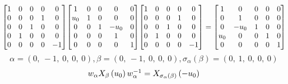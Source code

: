 \documentclass[11pt]{article}
\theoremstyle{definition}
\begin{document}
\[
\scaletoalign{\textwidth}{{\left[\begin{matrix}1 & 0 & 0 & 0 & 0\\0 & 0 & 0 & 1 & 0\\0 & 0 & 1 & 0 & 0\\0 & 1 & 0 & 0 & 0\\0 & 0 & 0 & 0 & -1\end{matrix}\right]} {\left[\begin{matrix}1 & 0 & 0 & 0 & 0\\u_{0} & 1 & 0 & 0 & 0\\0 & 0 & 1 & - u_{0} & 0\\0 & 0 & 0 & 1 & 0\\0 & 0 & 0 & 0 & 1\end{matrix}\right]} {\left[\begin{matrix}1 & 0 & 0 & 0 & 0\\0 & 0 & 0 & 1 & 0\\0 & 0 & 1 & 0 & 0\\0 & 1 & 0 & 0 & 0\\0 & 0 & 0 & 0 & -1\end{matrix}\right]} = {\left[\begin{matrix}1 & 0 & 0 & 0 & 0\\0 & 1 & 0 & 0 & 0\\0 & - u_{0} & 1 & 0 & 0\\u_{0} & 0 & 0 & 1 & 0\\0 & 0 & 0 & 0 & 1\end{matrix}\right]}}
\]
\[
\alpha = \left( 0, \  -1, \  0, \  0, \  0\right), \beta = \left( 0, \  -1, \  0, \  0, \  0\right), \sigma_{\alpha}(\beta) = \left( 0, \  1, \  0, \  0, \  0\right)
\]
\[
\scaletoalign{\textwidth}{w_{\alpha} X_{\beta}\left(u_{0}\right) w_{\alpha}^{-1} = X_{\sigma_{\alpha}\left(\beta\right)}\left(- u_{0}\right)}
\]
\end{document}
